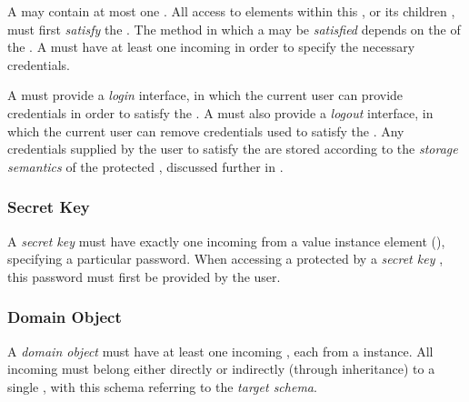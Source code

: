 A  may contain at most one . All access to elements within this , or its children , must first \textit{satisfy} the . The method in which a  may be \textit{satisfied} depends on the  of the . A  must have at least one incoming  in order to specify the necessary credentials.

A  must provide a \textit{login} interface, in which the current user can provide credentials in order to satisfy the . A  must also provide a \textit{logout} interface, in which the current user can remove credentials used to satisfy the . Any credentials supplied by the user to satisfy the  are stored according to the \textit{storage semantics} of the protected , discussed further in .

\subsubsection{Secret Key}

A \textit{secret key}  must have exactly one incoming  from a value instance element (), specifying a particular password. When accessing a  protected by a \textit{secret key} , this password must first be provided by the user.

\subsubsection{Domain Object}

A \textit{domain object}  must have at least one incoming , each from a  instance. All incoming  must belong either directly or indirectly (through inheritance) to a single , with this schema referring to the \textit{target schema}.

